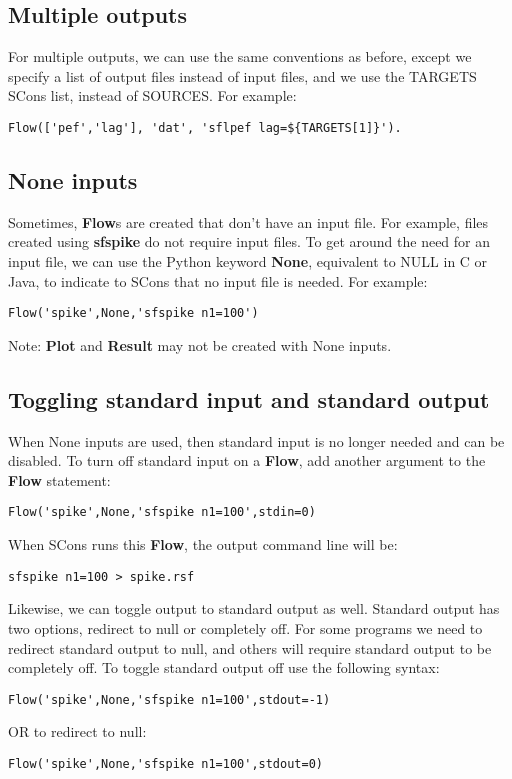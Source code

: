 \subsection{Multiple outputs}

For multiple outputs, we can use the same conventions as before, except we specify a list of output files instead of input files, and we use the TARGETS SCons list, instead of SOURCES.  For example:
\begin{verbatim}
Flow(['pef','lag'], 'dat', 'sflpef lag=${TARGETS[1]}').
\end{verbatim}

\subsection{None inputs}

Sometimes, \textbf{Flow}s are created that don't have an input file.  For example, files created using \textbf{sfspike} do not require input files.  To get around the need for an input file, we can use the Python keyword \textbf{None}, equivalent to NULL in C or Java, to indicate to SCons that no input file is needed.  For example:
\begin{verbatim}
Flow('spike',None,'sfspike n1=100')
\end{verbatim}
Note:  \textbf{Plot} and \textbf{Result} may not be created with None inputs.

\subsection{Toggling standard input and standard output}
When None inputs are used, then standard input is no longer needed and can be disabled. To turn off standard input on a \textbf{Flow}, add another argument to the \textbf{Flow} statement:
\begin{verbatim}
Flow('spike',None,'sfspike n1=100',stdin=0)
\end{verbatim}
When SCons runs this \textbf{Flow}, the output command line will be:
\begin{verbatim}
sfspike n1=100 > spike.rsf
\end{verbatim}
Likewise, we can toggle output to standard output as well.  Standard output has two options, redirect to null or completely off.  For some programs we need to redirect standard output to null, and others will require standard output to be completely off.  To toggle standard output off use the following syntax:
\begin{verbatim}
Flow('spike',None,'sfspike n1=100',stdout=-1)
\end{verbatim}
OR to redirect to null:
\begin{verbatim}
Flow('spike',None,'sfspike n1=100',stdout=0)
\end{verbatim}


